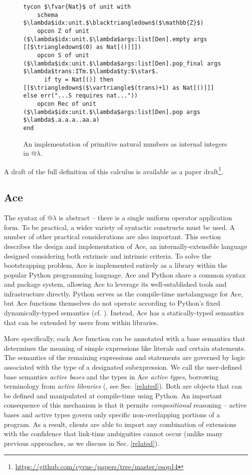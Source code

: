 \begin{figure}
\begin{lstlisting}
tycon $\fvar{Nat}$ of unit with  
    schema $\lambda$idx:unit.$\blacktriangledown$($\mathbb{Z}$) 
    opcon Z of unit ($\lambda$idx:unit.$\lambda$args:list[Den].empty args [[$\triangledown$(0) as Nat[()]]])
    opcon S of unit ($\lambda$idx:unit.$\lambda$args:list[Den].pop_final args $\lambda$trans:ITm.$\lambda$ty:$\star$. 
      if ty = Nat[()] then [[$\triangledown$($\vartriangle$(trans)+1) as Nat[()]]] else err("...S requires nat..."))
    opcon Rec of unit ($\lambda$idx:unit.$\lambda$args:list[Den].pop args $\lambda$.a.a.a..aa.a)
end
\end{lstlisting}
\caption{An implementation of primitive natural numbers as internal integers in @$\lambda$.}
\label{nat-atlam}
\end{figure}



A draft of the full definition of this calculus is available as a paper draft\footnote{\url{https://github.com/cyrus-/papers/tree/master/esop14}}.


\subsection{Ace}\label{ace}
The syntax of @$\lambda$ is abstract -- there is a single uniform operator application form. To be practical, a wider variety of syntactic constructs must be used. A number of other practical considerations are also important. This section describes the design and implementation of Ace, an internally-extensible language designed considering both extrinsic and intrinsic criteria. To solve the bootstrapping problem, Ace is implemented entirely as a library within the popular Python programming language. Ace and Python share a common syntax and package system, allowing Ace to leverage its well-established tools and infrastructure directly. Python serves as the compile-time metalanguage for Ace, but Ace functions themselves do not operate according to Python's fixed dynamically-typed semantics  (cf. \cite{Politz:2013:PFM:2509136.2509536,python}). Instead, Ace has a statically-typed semantics that can be extended by users from within libraries. 

More specifically, each Ace function can be annotated with a base semantics that determines the meaning of simple expressions like literals and certain statements. The semantics of the remaining expressions and statements are governed by logic associated with the type of a designated subexpression. We call the user-defined base semantics \emph{active bases} and the types in Ace \emph{active types}, borrowing terminology from \emph{active libraries} (\cite{activelibraries}, see Sec. \ref{related}). Both are objects that can be defined and manipulated at compile-time using Python. An important consequence of this mechanism is that it permits \emph{compositional} reasoning -- active bases and active types govern only specific non-overlapping portions of a program. As a result, clients are able to import any combination of extensions with the confidence that link-time ambiguities cannot occur (unlike many previous approaches, as we discuss in Sec. \ref{related}).


